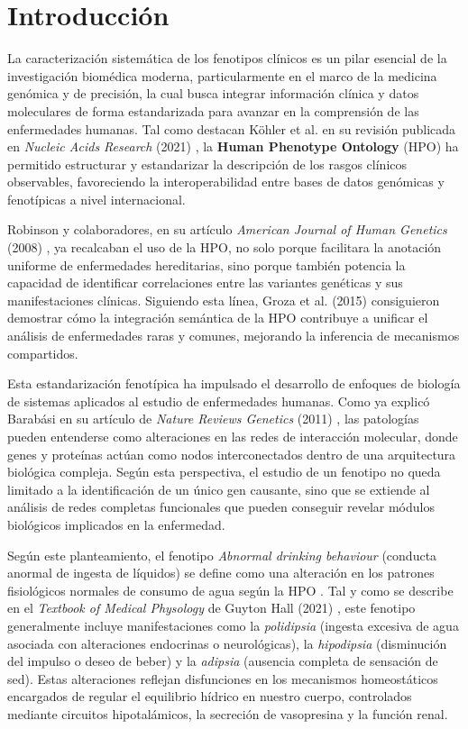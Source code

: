 \section{Introducción}

La caracterización sistemática de los fenotipos clínicos es un pilar esencial de la investigación biomédica moderna, particularmente en el marco de la medicina genómica y de precisión, la cual busca integrar información clínica y datos moleculares de forma estandarizada para avanzar en la comprensión de las enfermedades humanas. Tal como destacan Köhler et al. en su revisión publicada en \textit{Nucleic Acids Research} (2021) \cite{kohler2021hpo}, la \textbf{Human Phenotype Ontology} (HPO) ha permitido estructurar y estandarizar la descripción de los rasgos clínicos observables, favoreciendo la interoperabilidad entre bases de datos genómicas y fenotípicas a nivel internacional.

Robinson y colaboradores, en su artículo \textit{American Journal of Human Genetics} (2008) \cite{robinson2008hpo}, ya recalcaban el uso de la HPO, no solo porque facilitara la anotación uniforme de enfermedades hereditarias, sino porque también potencia la capacidad de identificar correlaciones entre las variantes genéticas y sus manifestaciones clínicas. Siguiendo esta línea, Groza et al. (2015) \cite{groza2015hpo} consiguieron demostrar cómo la integración semántica de la HPO contribuye a unificar el análisis de enfermedades raras y comunes, mejorando la inferencia de mecanismos compartidos.

Esta estandarización fenotípica ha impulsado el desarrollo de enfoques de biología de sistemas aplicados al estudio de enfermedades humanas. Como ya explicó Barabási en su artículo de \textit{Nature Reviews Genetics} (2011) \cite{barabasi2011network}, las patologías pueden entenderse como alteraciones en las redes de interacción molecular, donde genes y proteínas actúan como nodos interconectados dentro de una arquitectura biológica compleja. Según esta perspectiva, el estudio de un fenotipo no queda limitado a la identificación de un único gen causante, sino que se extiende al análisis de redes completas funcionales que pueden conseguir revelar módulos biológicos implicados en la enfermedad.

Según este planteamiento, el fenotipo \textit{Abnormal drinking behaviour} (conducta anormal de ingesta de líquidos) se define como una alteración en los patrones fisiológicos normales de consumo de agua según la HPO \cite{kohler2021hpo}. Tal y como se describe en el \textit{Textbook of Medical Physology} de Guyton Hall (2021) \cite{guyton2021physiology}, este fenotipo generalmente incluye manifestaciones como la \textit{polidipsia} (ingesta excesiva de agua asociada con alteraciones endocrinas o neurológicas), la \textit{hipodipsia} (disminución del impulso o deseo de beber) y la \textit{adipsia} (ausencia completa de sensación de sed). Estas alteraciones reflejan disfunciones en los mecanismos homeostáticos encargados de regular el equilibrio hídrico en nuestro cuerpo, controlados mediante circuitos hipotalámicos, la secreción de vasopresina y la función renal.


